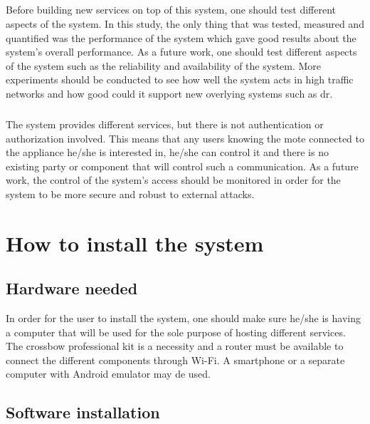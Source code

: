 \documentclass[oneside,12pt,a4paper,final]{book}
\begin{document}
\paragraph{}
Before building new services on top of this system, one should test different aspects of the system. In this study, the only thing that was tested, measured and quantified was the performance of the system which gave good results about the system's overall performance. As a future work, one should test different aspects of the system such as the reliability and availability of the system. More experiments should be conducted to see how well the system acts in high traffic networks and how good could it support new overlying systems such as \gls{dr}.
\paragraph{}
The system provides different services, but there is not authentication or authorization involved. This means that any users knowing the mote connected to the appliance he/she is interested in, he/she can control it and there is no existing party or component that will control such a communication. As a future work, the control of the system's access should be monitored in order for the system to be more secure and robust to external attacks.

\backmatter
\singlespacing
{}
 


\doublespacing
\appendix
\chapter{How to install the system}
\section{Hardware needed}
In order for the user to install the system, one should make sure he/she is having a computer that will be used for the sole purpose of hosting different services. The crossbow professional kit is a necessity and a router must be available to connect the different components through Wi-Fi. A smartphone or a separate computer with Android emulator may de used.

\section{Software installation}
\end{document}
